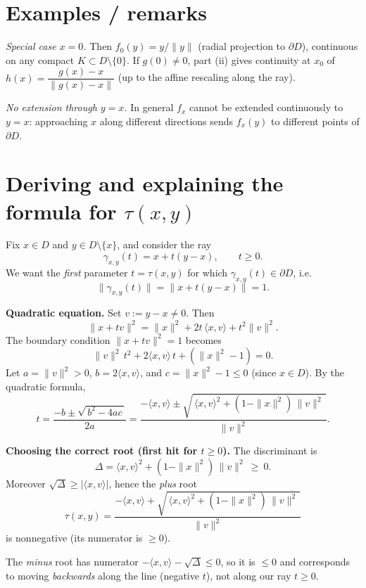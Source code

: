 \documentclass[12pt,a4paper]{article}
\theoremstyle{plain}
\theoremstyle{definition}
\theoremstyle{remark}
\theoremstyle{remark}
\begin{document}
\bigskip

\section*{Examples / remarks}

\noindent\emph{Special case $x=0$.}
Then $f_0(y)=y/\|y\|$ (radial projection to $\partial D$), continuous on any compact $K\subset D\setminus\{0\}$.
If $g(0)\ne 0$, part (ii) gives continuity at $x_0$ of
$h(x)=\dfrac{g(x)-x}{\|g(x)-x\|}$ (up to the affine rescaling along the ray).

\smallskip

\noindent\emph{No extension through $y=x$.}
In general $f_x$ cannot be extended continuously to $y=x$:
approaching $x$ along different directions sends $f_x(y)$ to different points of $\partial D$.
	
	
\section*{Deriving and explaining the formula for $\tau(x,y)$}

Fix $x\in D$ and $y\in D\setminus\{x\}$, and consider the ray
\[
\gamma_{x,y}(t)=x+t(y-x), \qquad t\ge 0 .
\]
We want the \emph{first} parameter $t=\tau(x,y)$ for which $\gamma_{x,y}(t)\in \partial D$, i.e.
\[
\|\gamma_{x,y}(t)\|=\|x+t(y-x)\|=1 .
\]

\smallskip

\noindent\textbf{Quadratic equation.}
Set $v:=y-x\neq 0$. Then
\[
\|x+t v\|^2
= \|x\|^2 + 2t\,\langle x,v\rangle + t^2\|v\|^2 .
\]
The boundary condition $\|x+t v\|^2=1$ becomes
\[
\|v\|^2\,t^2 + 2\langle x,v\rangle\,t + (\|x\|^2-1)=0 .
\]
Let $a=\|v\|^2>0$, $b=2\langle x,v\rangle$, and $c=\|x\|^2-1\le 0$ (since $x\in D$).
By the quadratic formula,
\[
t
= \frac{-b \pm \sqrt{\,b^2-4ac\,}}{2a}
= \frac{-\langle x,v\rangle \pm \sqrt{\,\langle x,v\rangle^{2} + (1-\|x\|^{2})\,\|v\|^{2}\,}}{\|v\|^{2}} .
\]

\smallskip

\noindent\textbf{Choosing the correct root (first hit for $t\ge 0$).}
The discriminant is
\[
\Delta=\langle x,v\rangle^{2} + (1-\|x\|^{2})\,\|v\|^{2}\ \ge\ 0 .
\]
Moreover $\sqrt{\Delta}\ge |\langle x,v\rangle|$, hence the \emph{plus} root
\[
\boxed{\displaystyle
	\tau(x,y)=\frac{-\langle x,v\rangle + \sqrt{\,\langle x,v\rangle^{2} + (1-\|x\|^{2})\,\|v\|^{2}\,}}{\|v\|^{2}}
}
\]
is nonnegative (its numerator is $\ge 0$).

The \emph{minus} root has numerator $-\langle x,v\rangle-\sqrt{\Delta}\le 0$, so it is $\le 0$ and corresponds
to moving \emph{backwards} along the line (negative $t$), not along our ray $t\ge 0$.
\end{document}
